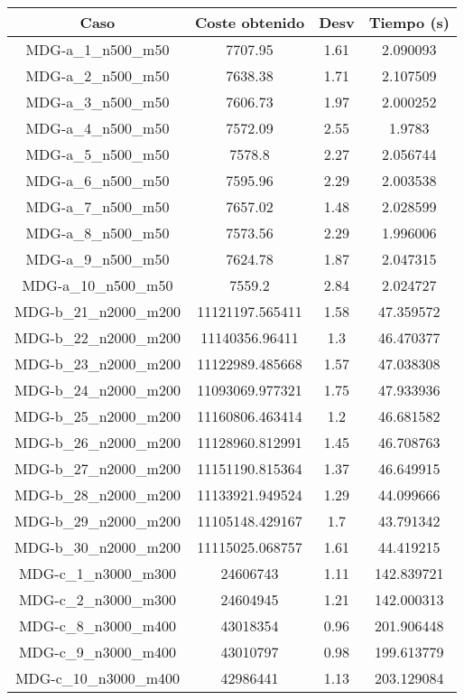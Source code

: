 \documentclass{article}
\begin{document}
\begin{table}[H]
	\centering
	\begin{tabular}{|cccc|}
		\hline
		Caso & Coste obtenido & Desv & Tiempo (s)\\ \hline
		MDG-a\_1\_n500\_m50 & 7707.95 & 1.61 & 2.090093\\
		MDG-a\_2\_n500\_m50 & 7638.38 & 1.71 & 2.107509\\
		MDG-a\_3\_n500\_m50 & 7606.73 & 1.97 & 2.000252\\
		MDG-a\_4\_n500\_m50 & 7572.09 & 2.55 & 1.9783\\
		MDG-a\_5\_n500\_m50 & 7578.8 & 2.27 & 2.056744\\
		MDG-a\_6\_n500\_m50 & 7595.96 & 2.29 & 2.003538\\
		MDG-a\_7\_n500\_m50 & 7657.02 & 1.48 & 2.028599\\
		MDG-a\_8\_n500\_m50 & 7573.56 & 2.29 & 1.996006\\
		MDG-a\_9\_n500\_m50 & 7624.78 & 1.87 & 2.047315\\
		MDG-a\_10\_n500\_m50 & 7559.2 & 2.84 & 2.024727\\
		MDG-b\_21\_n2000\_m200 & 11121197.565411 & 1.58 & 47.359572\\
		MDG-b\_22\_n2000\_m200 & 11140356.96411 & 1.3 & 46.470377\\
		MDG-b\_23\_n2000\_m200 & 11122989.485668 & 1.57 & 47.038308\\
		MDG-b\_24\_n2000\_m200 & 11093069.977321 & 1.75 & 47.933936\\
		MDG-b\_25\_n2000\_m200 & 11160806.463414 & 1.2 & 46.681582\\
		MDG-b\_26\_n2000\_m200 & 11128960.812991 & 1.45 & 46.708763\\
		MDG-b\_27\_n2000\_m200 & 11151190.815364 & 1.37 & 46.649915\\
		MDG-b\_28\_n2000\_m200 & 11133921.949524 & 1.29 & 44.099666\\
		MDG-b\_29\_n2000\_m200 & 11105148.429167 & 1.7 & 43.791342\\
		MDG-b\_30\_n2000\_m200 & 11115025.068757 & 1.61 & 44.419215\\
		MDG-c\_1\_n3000\_m300 & 24606743 & 1.11 & 142.839721\\
		MDG-c\_2\_n3000\_m300 & 24604945 & 1.21 & 142.000313\\
		MDG-c\_8\_n3000\_m400 & 43018354 & 0.96 & 201.906448\\
		MDG-c\_9\_n3000\_m400 & 43010797 & 0.98 & 199.613779\\
		MDG-c\_10\_n3000\_m400 & 42986441 & 1.13 & 203.129084\\

\end{tabular}
\end{table}
\end{document}
